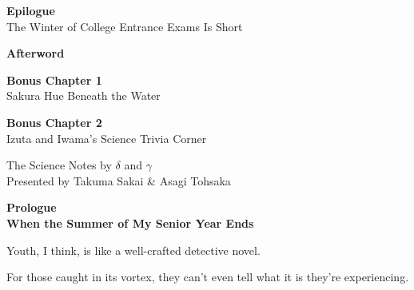 \documentclass[
    a4paper,
    12pt,
    twoside,
    openany,
    UTF8,
    fontset=windows
]{ctexbook}
\begin{document}
\begin{minipage}{0.85\textwidth}
\begin{flushleft}
\begin{list}{}
        \item \textbf{Epilogue} \dotfill \pageref{sec:epilogue} \\
        The Winter of College Entrance Exams Is Short

        \item \textbf{Afterword} \dotfill \pageref{sec:afterword}

        \item \textbf{Bonus Chapter 1} \dotfill \pageref{sec:bonus} \\
        Sakura Hue Beneath the Water
        
        \item \textbf{Bonus Chapter 2} \dotfill \pageref{sec:b}\\
        Izuta and Iwama's Science Trivia Corner
    \end{list}
    \end{flushleft}

    \vspace{0.8cm}

    \begin{flushleft}
    \footnotesize\color{gray}
    The Science Notes by $\delta$ and $\gamma$ \\
    Presented by Takuma Sakai \& Asagi Tohsaka
    \end{flushleft}
\end{minipage}
\hspace*{\fill}

\vspace*{0pt}
\clearpage

\newpage
\thispagestyle{empty}
\mbox{}
\newpage

\setcounter{page}{1}            %

\clearpage
\thispagestyle{plain}
\begin{center}
    \large\bfseries
    Prologue\\
    When the Summer of My Senior Year Ends
\end{center}
\label{sec:prologue}
\vspace{1cm}

Youth, I think, is like a well-crafted detective novel.

For those caught in its vortex, they can't even tell what it is they're experiencing.
\end{document}
